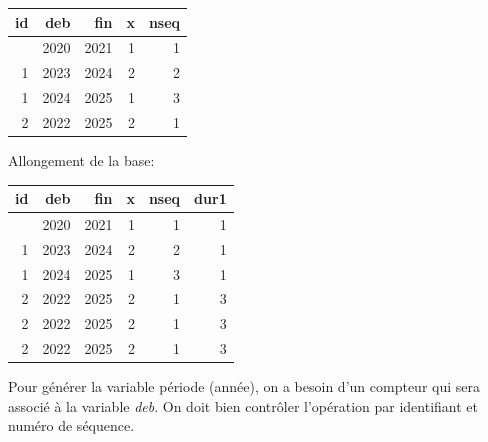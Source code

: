 \documentclass[
  12pt,
  letterpaper,
  DIV=11,
  numbers=noendperiod,
  onepage,
  openany]{scrreprt}
\newenvironment{Shaded}{\begin{snugshade}}{\end{snugshade}}
\newcommand{\AttributeTok}[1]{\textcolor[rgb]{0.80,0.80,0.80}{#1}}
\newcommand{\CommentTok}[1]{\textcolor[rgb]{0.50,0.62,0.50}{#1}}
\newcommand{\DecValTok}[1]{\textcolor[rgb]{0.86,0.86,0.80}{#1}}
\newcommand{\FunctionTok}[1]{\textcolor[rgb]{0.94,0.94,0.56}{#1}}
\newcommand{\NormalTok}[1]{\textcolor[rgb]{0.80,0.80,0.80}{#1}}
\newcommand{\OtherTok}[1]{\textcolor[rgb]{0.94,0.94,0.56}{#1}}
\newcommand{\SpecialCharTok}[1]{\textcolor[rgb]{0.86,0.64,0.64}{#1}}
\begin{document}
\begin{longtable}[]{@{}rrrrr@{}}
\toprule\noalign{}
id & deb & fin & x & nseq \\
\midrule\noalign{}
\endhead
\bottomrule\noalign{}
\endlastfoot
1 & 2020 & 2021 & 1 & 1 \\
1 & 2023 & 2024 & 2 & 2 \\
1 & 2024 & 2025 & 1 & 3 \\
2 & 2022 & 2025 & 2 & 1 \\
\end{longtable}

Allongement de la base:

\begin{Shaded}
\end{Shaded}

\begin{longtable}[]{@{}rrrrrr@{}}
\toprule\noalign{}
id & deb & fin & x & nseq & dur1 \\
\midrule\noalign{}
\endhead
\bottomrule\noalign{}
\endlastfoot
1 & 2020 & 2021 & 1 & 1 & 1 \\
1 & 2023 & 2024 & 2 & 2 & 1 \\
1 & 2024 & 2025 & 1 & 3 & 1 \\
2 & 2022 & 2025 & 2 & 1 & 3 \\
2 & 2022 & 2025 & 2 & 1 & 3 \\
2 & 2022 & 2025 & 2 & 1 & 3 \\
\end{longtable}

Pour générer la variable période (année), on a besoin d'un compteur qui
sera associé à la variable \emph{deb}. On doit bien contrôler
l'opération par identifiant et numéro de séquence.

\begin{Shaded}
\end{Shaded}
\end{document}
